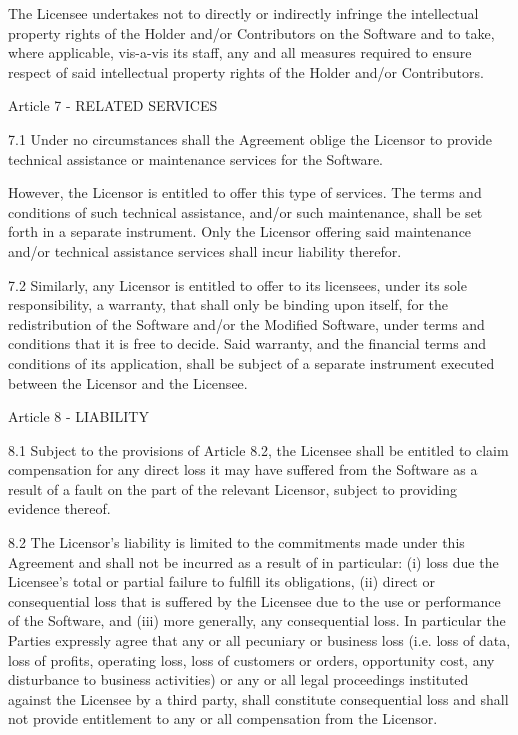 \documentclass[oneside,english,onecolumn,letterpaper]{book}
\begin{document}
The Licensee undertakes not to directly or indirectly infringe the intellectual property rights of the Holder and/or Contributors on the Software and to take, where applicable, vis-a-vis its staff, any and all measures required to ensure respect of said intellectual property rights of the Holder and/or Contributors.

Article 7 - RELATED SERVICES

7.1 Under no circumstances shall the Agreement oblige the Licensor to provide technical assistance or maintenance services for the Software.

However, the Licensor is entitled to offer this type of services. The terms and conditions of such technical assistance, and/or such maintenance, shall be set forth in a separate instrument. Only the Licensor offering said maintenance and/or technical assistance services shall incur liability therefor.

7.2 Similarly, any Licensor is entitled to offer to its licensees, under its sole responsibility, a warranty, that shall only be binding upon itself, for the redistribution of the Software and/or the Modified Software, under terms and conditions that it is free to decide. Said warranty, and the financial terms and conditions of its application, shall be subject of a separate instrument executed between the Licensor and the Licensee.

Article 8 - LIABILITY

8.1 Subject to the provisions of Article 8.2, the Licensee shall be entitled to claim compensation for any direct loss it may have suffered from the Software as a result of a fault on the part of the relevant Licensor, subject to providing evidence thereof.

8.2 The Licensor's liability is limited to the commitments made under this Agreement and shall not be incurred as a result of in particular: (i) loss due the Licensee's total or partial failure to fulfill its obligations, (ii) direct or consequential loss that is suffered by the Licensee due to the use or performance of the Software, and (iii) more generally, any consequential loss. In particular the Parties expressly agree that any or all pecuniary or business loss (i.e. loss of data, loss of profits, operating loss, loss of customers or orders, opportunity cost, any disturbance to business activities) or any or all legal proceedings instituted against the Licensee by a third party, shall constitute consequential loss and shall not provide entitlement to any or all compensation from the Licensor.
\end{document}
